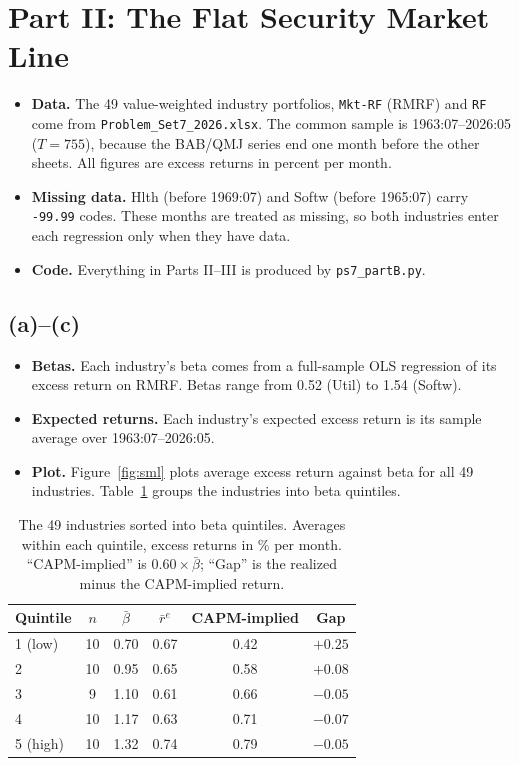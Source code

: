 
\section{Part II: The Flat Security Market Line}

\begin{itemize}
  \item \textbf{Data.} The 49 value-weighted industry portfolios, \texttt{Mkt-RF} (RMRF) and \texttt{RF} come from \texttt{Problem\_\allowbreak{}Set7\_\allowbreak{}2026.xlsx}. The common sample is 1963:07--2026:05 ($T=755$), because the BAB/QMJ series end one month before the other sheets. All figures are excess returns in percent per month.
  \item \textbf{Missing data.} Hlth (before 1969:07) and Softw (before 1965:07) carry \texttt{-99.99} codes. These months are treated as missing, so both industries enter each regression only when they have data.
  \item \textbf{Code.} Everything in Parts II--III is produced by \texttt{ps7\_partB.py}.
\end{itemize}

\subsection*{(a)--(c)}
\begin{itemize}
  \item \textbf{Betas.} Each industry's beta comes from a full-sample OLS regression of its excess return on RMRF. Betas range from 0.52 (Util) to 1.54 (Softw).
  \item \textbf{Expected returns.} Each industry's expected excess return is its sample average over 1963:07--2026:05.
  \item \textbf{Plot.} Figure~\ref{fig:sml} plots average excess return against beta for all 49 industries. Table~\ref{tab:betas} groups the industries into beta quintiles.
\end{itemize}

\begin{table}[H]
\centering
\caption{The 49 industries sorted into beta quintiles. Averages within each quintile, excess returns in \% per month. ``CAPM-implied'' is $0.60\times\bar\beta$; ``Gap'' is the realized minus the CAPM-implied return.}
\label{tab:betas}
\begin{tabular}{lccccc}
\toprule
Quintile & $n$ & $\bar\beta$ & $\bar r^e$ & CAPM-implied & Gap \\
\midrule
1 (low)  & 10 & 0.70 & 0.67 & 0.42 & $+0.25$ \\
2        & 10 & 0.95 & 0.65 & 0.58 & $+0.08$ \\
3        &  9 & 1.10 & 0.61 & 0.66 & $-0.05$ \\
4        & 10 & 1.17 & 0.63 & 0.71 & $-0.07$ \\
5 (high) & 10 & 1.32 & 0.74 & 0.79 & $-0.05$ \\
\bottomrule
\end{tabular}
\end{table}

